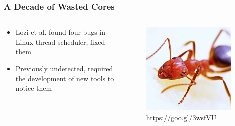 \documentclass{beamer}
\newcommand{\linespace}{\vskip 0.25cm}
\begin{document}
\begin{frame}
\frametitle{A Decade of Wasted Cores}

\begin{columns}
\begin{column}{0.72\textwidth}
\begin{itemize}
\item Lozi et al. found four bugs in Linux thread scheduler, fixed them~\cite{Lozi:2016}

\linespace

\item Previously undetected, required the development of new tools to notice them

\end{itemize}
\end{column}
\begin{column}{0.28\textwidth} %
\begin{figure}
\centering
\includegraphics[width=0.95\textwidth]{Illustrations/ant_from_pexels.png}
\caption*{https://goo.gl/3wsfVU}
\end{figure}

\end{column}
\end{columns}

\end{frame}
\end{document}
